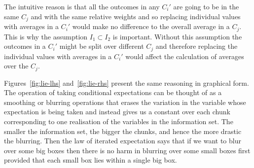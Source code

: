 \documentclass[12pt,reqno,openany]{amsbook}
\theoremstyle{plain}
\theoremstyle{definition}
\begin{document}
The intuitive reason is that all the outcomes in any $C_i'$ are going to
be in the same $C_j$ and with the same relative weights and so
replacing individual values with averages in a $C_i'$ would make no
difference to the overall average in a $C_j$. This is why the
assumption $I_1 \subset I_2$ is important. Without this assumption
the outcomes in a $C_i'$ might be split over different $C_j$ and
therefore replacing the individual values with averages in a $C_i'$
would affect the calculation of averages over the $C_j$.

Figures~\ref{fig:lie-lhs} and~\ref{fig:lie-rhs} present the same reasoning in
graphical form. The operation of taking conditional expectations can
be thought of as a smoothing or blurring operations that erases the
variation in the variable whose expectation is being taken and instead
gives
us a constant over each chunk corresponding to
one realisation of the variables in the information set. The smaller
the information set, the bigger the chunks, and hence the more drastic
the blurring. Then the law of iterated expectation says that if we
want to blur over some big boxes then there is no harm in blurring over
some small boxes first provided that each small box lies within a
single big box.
\end{document}
